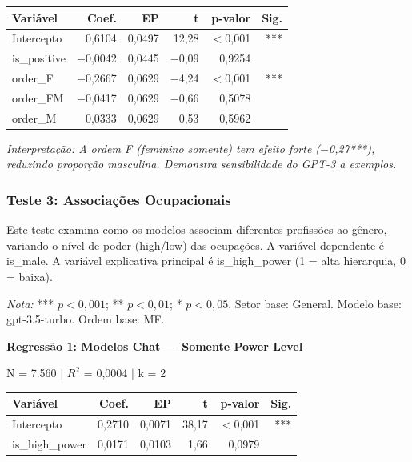 \documentclass[12pt,a4paper]{article}
\begin{document}
\begin{table}[H]
\centering
\begin{tabular}{lrrrrr}
\toprule
\textbf{Variável} & \textbf{Coef.} & \textbf{EP} & \textbf{t} & \textbf{p-valor} & \textbf{Sig.} \\
\midrule
Intercepto & 0,6104 & 0,0497 & 12,28 & $<$0,001 & *** \\
is\_positive & $-$0,0042 & 0,0445 & $-$0,09 & 0,9254 & \\
order\_F & $-$0,2667 & 0,0629 & $-$4,24 & $<$0,001 & *** \\
order\_FM & $-$0,0417 & 0,0629 & $-$0,66 & 0,5078 & \\
order\_M & 0,0333 & 0,0629 & 0,53 & 0,5962 & \\
\bottomrule
\end{tabular}
\end{table}

\noindent\textit{Interpretação: A ordem F (feminino somente) tem efeito forte
($-$0,27***), reduzindo proporção masculina. Demonstra sensibilidade do
GPT-3 a exemplos.}


\subsubsection{Teste 3: Associações Ocupacionais}

Este teste examina como os modelos associam diferentes profissões ao
gênero, variando o nível de poder (high/low) das ocupações. A variável
dependente é is\_male. A variável explicativa principal é is\_high\_power
(1 = alta hierarquia, 0 = baixa).

\textit{Nota:} *** $p < 0,001$; ** $p < 0,01$; * $p < 0,05$. Setor base:
General. Modelo base: gpt-3.5-turbo. Ordem base: MF.

\vspace{0.5cm}
\noindent\textbf{Regressão 1: Modelos Chat --- Somente Power Level}

\noindent N = 7.560 $|$ $R^2$ = 0,0004 $|$ k = 2

\begin{table}[H]
\centering
\begin{tabular}{lrrrrr}
\toprule
\textbf{Variável} & \textbf{Coef.} & \textbf{EP} & \textbf{t} & \textbf{p-valor} & \textbf{Sig.} \\
\midrule
Intercepto & 0,2710 & 0,0071 & 38,17 & $<$0,001 & *** \\
is\_high\_power & 0,0171 & 0,0103 & 1,66 & 0,0979 & \\
\bottomrule
\end{tabular}
\end{table}
\end{document}
